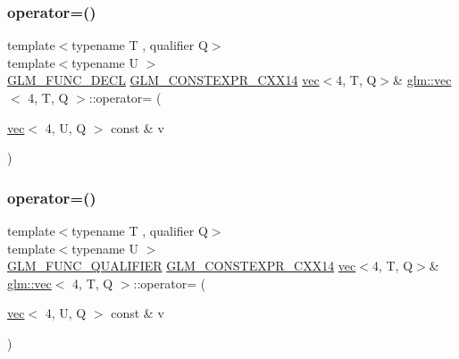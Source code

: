 \subsubsection{\texorpdfstring{operator=()}{operator=()}\hspace{0.1cm}{\footnotesize\ttfamily [2/3]}}
{\footnotesize\ttfamily template$<$typename T , qualifier Q$>$ \\
template$<$typename U $>$ \\
\mbox{\hyperlink{setup_8hpp_ab2d052de21a70539923e9bcbf6e83a51}{G\+L\+M\+\_\+\+F\+U\+N\+C\+\_\+\+D\+E\+CL}} \mbox{\hyperlink{setup_8hpp_a4dd12abf5e1164bc57f3a34671d03844}{G\+L\+M\+\_\+\+C\+O\+N\+S\+T\+E\+X\+P\+R\+\_\+\+C\+X\+X14}} \mbox{\hyperlink{structglm_1_1vec}{vec}}$<$4, T, Q$>$\& \mbox{\hyperlink{structglm_1_1vec}{glm\+::vec}}$<$ 4, T, Q $>$\+::operator= (\begin{DoxyParamCaption}\item[{\mbox{\hyperlink{structglm_1_1vec}{vec}}$<$ 4, U, Q $>$ const \&}]{v }\end{DoxyParamCaption})}

\mbox{\label{structglm_1_1vec_3_014_00_01_t_00_01_q_01_4_a47b604569998091880bd33056928ab50}} 
\subsubsection{\texorpdfstring{operator=()}{operator=()}\hspace{0.1cm}{\footnotesize\ttfamily [3/3]}}
{\footnotesize\ttfamily template$<$typename T , qualifier Q$>$ \\
template$<$typename U $>$ \\
\mbox{\hyperlink{setup_8hpp_a33fdea6f91c5f834105f7415e2a64407}{G\+L\+M\+\_\+\+F\+U\+N\+C\+\_\+\+Q\+U\+A\+L\+I\+F\+I\+ER}} \mbox{\hyperlink{setup_8hpp_a4dd12abf5e1164bc57f3a34671d03844}{G\+L\+M\+\_\+\+C\+O\+N\+S\+T\+E\+X\+P\+R\+\_\+\+C\+X\+X14}} \mbox{\hyperlink{structglm_1_1vec}{vec}}$<$4, T, Q$>$\& \mbox{\hyperlink{structglm_1_1vec}{glm\+::vec}}$<$ 4, T, Q $>$\+::operator= (\begin{DoxyParamCaption}\item[{\mbox{\hyperlink{structglm_1_1vec}{vec}}$<$ 4, U, Q $>$ const \&}]{v }\end{DoxyParamCaption})}



